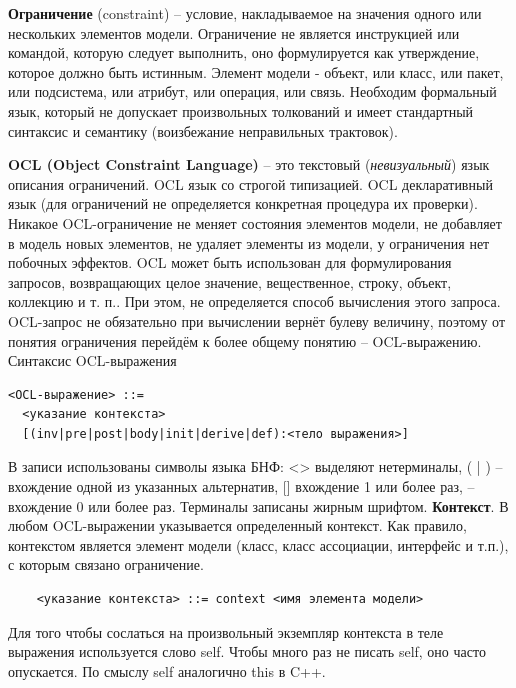 
\textbf{Ограничение} (constraint) – условие, накладываемое на значения одного или нескольких
элементов модели. Ограничение не является инструкцией или командой, которую следует выполнить,
оно формулируется как утверждение, которое должно быть истинным. Элемент модели - объект, или класс, или пакет, или подсистема, или атрибут, или операция, или связь.
Необходим формальный язык, который не допускает произвольных толкований и имеет стандартный синтаксис и семантику (воизбежание неправильных трактовок). 

\textbf{OCL (Object Constraint Language)} – это текстовый (\textit{невизуальный}) язык описания ограничений. OCL язык со строгой типизацией. OCL декларативный язык (для ограничений не определяется конкретная процедура их проверки). Никакое OCL-ограничение не меняет состояния элементов модели, не добавляет в модель новых элементов, не удаляет элементы из модели, у ограничения нет побочных эффектов. OCL может быть использован для формулирования запросов, возвращающих целое значение, вещественное, строку, объект, коллекцию и т. п.. При этом, не определяется способ вычисления этого запроса. OCL-запрос не обязательно при вычислении вернёт булеву величину, поэтому от понятия ограничения перейдём к более общему понятию – OCL-выражению.
Синтаксис OCL-выражения
\begin{verbatim}
<OCL-выражение> ::=
  <указание контекста>
  [(inv|pre|post|body|init|derive|def):<тело выражения>]
\end{verbatim}

В записи использованы символы языка БНФ: <> выделяют нетерминалы, ( | ) –вхождение одной
из указанных альтернатив, [] вхождение 1 или более раз, {} – вхождение 0 или более раз. Терминалы
записаны жирным шрифтом.
\textbf{Контекст}. В любом OCL-выражении указывается определенный контекст. Как правило,
контекстом является элемент модели (класс, класс ассоциации, интерфейс и т.п.), с которым связано
ограничение.
\begin{verbatim}
    <указание контекста> ::= context <имя элемента модели>
\end{verbatim}

Для того чтобы сослаться на произвольный экземпляр контекста в теле выражения используется
слово self. Чтобы много раз не писать self, оно часто опускается. По смыслу self аналогично this в C++.

